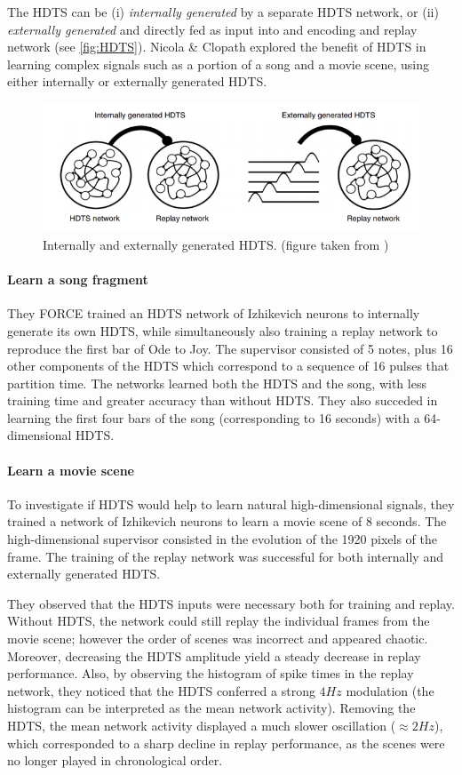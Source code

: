 \documentclass[10pt,a4paper, final]{report} %
\begin{document}
The HDTS can be (i) \textit{internally generated} by a separate HDTS network, or (ii) \textit{externally generated} and directly fed as input into and encoding and replay network (see \autoref{fig:HDTS}). Nicola \& Clopath explored the benefit of HDTS in learning complex signals such as a portion of a song and a movie scene, using either internally or externally generated HDTS. 

\begin{figure}
\centering
\includegraphics[width=1\textwidth]{images/HDTS}
\caption{Internally and externally generated HDTS. (figure taken from \cite{nicola2017supervised})}
\label{fig:HDTS}
\end{figure}

\paragraph{Learn a song fragment}
They FORCE trained an HDTS network of Izhikevich neurons to internally generate its own HDTS, while simultaneously also training a replay network to reproduce the first bar of Ode to Joy. The supervisor consisted of 5 notes, plus 16 other components of the HDTS which correspond to a sequence of 16 pulses that partition time. The networks learned both the HDTS and the song, with less training time and greater accuracy than without HDTS. They also succeded in learning the first four bars of the song (corresponding to 16 seconds) with a 64-dimensional HDTS.

\paragraph{Learn a movie scene}
To investigate if HDTS would help to learn natural high-dimensional signals, they trained a network of Izhikevich neurons to learn a movie scene of 8 seconds. The high-dimensional supervisor consisted in the evolution of the 1920 pixels of the frame. The training of the replay network was successful for both internally and externally generated HDTS.

They observed that the HDTS inputs were necessary both for training and replay. Without HDTS, the network could still replay the individual frames from the movie scene; however the order of scenes was incorrect and appeared chaotic. Moreover, decreasing the HDTS amplitude yield a steady decrease in replay performance. Also, by observing the histogram of spike times in the replay network, they noticed that the HDTS conferred a strong $4Hz$ modulation (the histogram can be interpreted as the mean network activity). Removing the HDTS, the mean network activity displayed a much slower oscillation ($\approx 2 Hz$), which corresponded to a sharp decline in replay performance, as the scenes were no longer played in chronological order.
\end{document}
